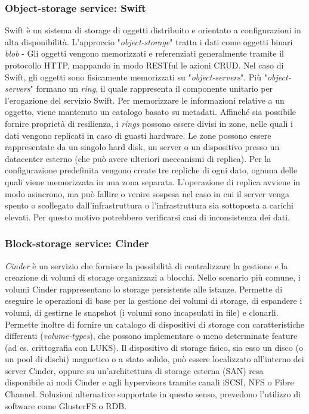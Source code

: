 \documentclass[../main.tex]{subfiles}
\begin{document}
\subsubsection{Object-storage service: Swift}
Swift è un sistema di storage di oggetti distribuito e orientato a configurazioni in alta disponibilità.
L'approccio "\textit{object-storage}" tratta i dati come oggetti binari \textit{blob} - 
Gli oggetti vengono memorizzati e referenziati generalmente tramite il protocollo HTTP, mappando in modo RESTful le azioni CRUD.
Nel caso di Swift, gli oggetti sono fisicamente memorizzati su "\textit{object-servers}".
Più "\textit{object-servers}" formano un \textit{ring}, il quale rappresenta il componente unitario per l'erogazione del servizio Swift.
Per memorizzare le informazioni relative a un oggetto, viene mantenuto un catalogo basato su metadati.
Affinché sia possibile fornire proprietà di resilienza, i \textit{rings} possono essere divisi in zone, nelle quali i dati vengono replicati in caso di guasti hardware.
Le zone possono essere rappresentate da un singolo hard disk, un server o un dispositivo presso un datacenter esterno (che può avere ulteriori meccanismi di replica).
Per la configurazione predefinita vengono create tre repliche di ogni dato, ognuna delle quali viene memorizzata in una zona separata.
L'operazione di replica avviene in modo asincrono, ma può fallire o venire sospesa nel caso in cui il server venga spento o scollegato dall'infrastruttura o l'infrastruttura sia sottoposta a carichi elevati.
Per questo motivo potrebbero verificarsi casi di inconsistenza dei dati.

\subsubsection{Block-storage service: Cinder}
\textit{Cinder} è un servizio che fornisce la possibilità di centralizzare la gestione e la creazione di volumi di storage organizzazi a blocchi.
Nello scenario più comune, i volumi Cinder rappresentano lo storage persistente alle istanze.
Permette di eseguire le operazioni di base per la gestione dei volumi di storage, di espandere i volumi, di gestirne le snapshot (i volumi sono incapsulati in file) e clonarli.
Permette inoltre di fornire un catalogo di dispositivi di storage con caratteristiche differenti (\textit{volume-types}), che possono implementare o meno determinate feature (ad es. crittografia con LUKS).
Il dispositivo di storage fisico, sia esso un disco (o un pool di dischi) magnetico o a stato solido, può essere localizzato all'interno dei server Cinder, oppure su un'architettura di storage esterna (SAN) resa disponibile ai nodi Cinder e agli hypervisors tramite canali iSCSI, NFS o Fibre Channel.
Soluzioni alternative supportate in questo senso, prevedono l'utilizzo di software come GlusterFS o RDB.
\end{document}
